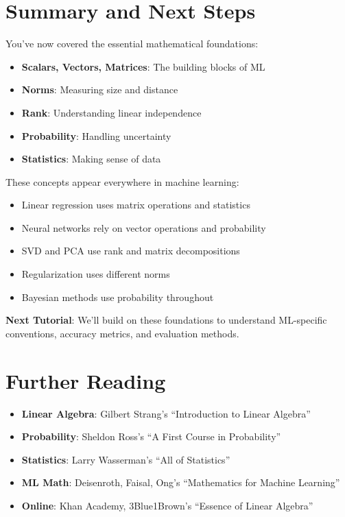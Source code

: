 \documentclass{article}
\begin{document}
\section{Summary and Next Steps}

You've now covered the essential mathematical foundations:
\begin{itemize}
    \item \textbf{Scalars, Vectors, Matrices}: The building blocks of ML
    \item \textbf{Norms}: Measuring size and distance
    \item \textbf{Rank}: Understanding linear independence
    \item \textbf{Probability}: Handling uncertainty
    \item \textbf{Statistics}: Making sense of data
\end{itemize}

These concepts appear everywhere in machine learning:
\begin{itemize}
    \item Linear regression uses matrix operations and statistics
    \item Neural networks rely on vector operations and probability
    \item SVD and PCA use rank and matrix decompositions
    \item Regularization uses different norms
    \item Bayesian methods use probability throughout
\end{itemize}

\textbf{Next Tutorial}: We'll build on these foundations to understand ML-specific conventions, accuracy metrics, and evaluation methods.

\section{Further Reading}

\begin{itemize}
    \item \textbf{Linear Algebra}: Gilbert Strang's ``Introduction to Linear Algebra''
    \item \textbf{Probability}: Sheldon Ross's ``A First Course in Probability''
    \item \textbf{Statistics}: Larry Wasserman's ``All of Statistics''
    \item \textbf{ML Math}: Deisenroth, Faisal, Ong's ``Mathematics for Machine Learning''
    \item \textbf{Online}: Khan Academy, 3Blue1Brown's ``Essence of Linear Algebra''
\end{itemize}
\end{document}
